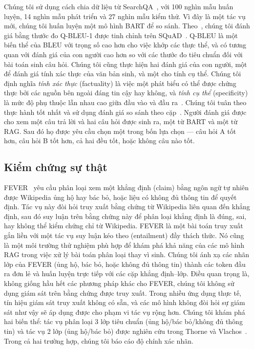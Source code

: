 \documentclass[10pt,letterpaper]{article}
\begin{document}
Chúng tôi sử dụng cách chia dữ liệu từ SearchQA~\cite{b10}, với 100 nghìn mẫu
huấn luyện, 14 nghìn mẫu phát triển và 27 nghìn mẫu kiểm thử. Vì đây là một tác
vụ mới, chúng tôi huấn luyện một mô hình BART để so sánh. Theo~\cite{b67},
chúng tôi đánh giá bằng thước đo Q-BLEU-1 được tinh chỉnh trên
SQuAD~\cite{b42}. Q-BLEU là một biến thể của BLEU với trọng số cao hơn cho việc
khớp các thực thể, và có tương quan với đánh giá của con người cao hơn so với
các thước đo tiêu chuẩn đối với bài toán sinh câu hỏi. Chúng tôi cũng thực hiện
hai đánh giá của con người, một để đánh giá tính xác thực của văn bản sinh, và
một cho tính cụ thể. Chúng tôi định nghĩa \emph{tính xác thực} (factuality) là
việc một phát biểu có thể được chứng thực bởi các nguồn bên ngoài đáng tin cậy
hay không, và \emph{tính cụ thể} (specificity) là mức độ phụ thuộc lẫn nhau cao
giữa đầu vào và đầu ra~\cite{b33}. Chúng tôi tuân theo thực hành tốt nhất và sử
dụng đánh giá so sánh theo cặp~\cite{b34}. Người đánh giá được cho xem một câu
trả lời và hai câu hỏi được sinh ra, một từ BART và một từ RAG. Sau đó họ được
yêu cầu chọn một trong bốn lựa chọn --- câu hỏi A tốt hơn, câu hỏi B tốt hơn,
cả hai đều tốt, hoặc không câu nào tốt.

\subsection{Kiểm chứng sự thật}

FEVER~\cite{b56} yêu cầu phân loại xem một khẳng định (claim) bằng ngôn ngữ tự
nhiên được Wikipedia ủng hộ hay bác bỏ, hoặc liệu có không đủ thông tin để
quyết định. Tác vụ này đòi hỏi truy xuất bằng chứng từ Wikipedia liên quan đến
khẳng định, sau đó suy luận trên bằng chứng này để phân loại khẳng định là
đúng, sai, hay không thể kiểm chứng chỉ từ Wikipedia. FEVER là một bài toán
truy xuất gắn liền với một tác vụ suy luận kéo theo (entailment) đầy thách
thức. Nó cũng là một môi trường thử nghiệm phù hợp để khám phá khả năng của các
mô hình RAG trong việc xử lý bài toán phân loại thay vì sinh. Chúng tôi ánh xạ
các nhãn lớp của FEVER (ủng hộ, bác bỏ, hoặc không đủ thông tin) thành các
token đầu ra đơn lẻ và huấn luyện trực tiếp với các cặp khẳng định--lớp. Điều
quan trọng là, không giống hầu hết các phương pháp khác cho FEVER, chúng tôi
không sử dụng giám sát trên bằng chứng được truy xuất. Trong nhiều ứng dụng
thực tế, tín hiệu giám sát truy xuất không có sẵn, và các mô hình không đòi hỏi
sự giám sát như vậy sẽ áp dụng được cho phạm vi tác vụ rộng hơn. Chúng tôi khám
phá hai biến thể: tác vụ phân loại 3 lớp tiêu chuẩn (ủng hộ/bác bỏ/không đủ
thông tin) và tác vụ 2 lớp (ủng hộ/bác bỏ) được nghiên cứu trong Thorne và
Vlachos~\cite{b57}. Trong cả hai trường hợp, chúng tôi báo cáo độ chính xác
nhãn.
\end{document}
